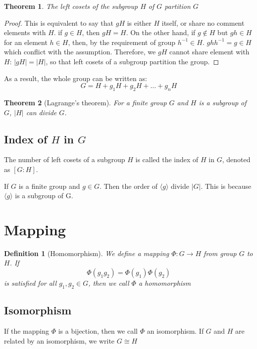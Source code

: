 \documentclass{amsart}
\newtheorem{definition}{Definition}
\newtheorem{theorem}{Theorem}
\begin{document}
\vspace{10pt}

\begin{theorem}
    The left cosets of the subgroup $H$ of $G$ partition $G$
\end{theorem}
\begin{proof}
    This is equivalent to say that $gH$ is either $H$ itself, or share no comment elements with $H$.
    if $g\in H$, then $gH = H$. On the other hand, 
    if $g\notin H$ but $gh \in H$ for an element $h\in H$, then, by the requirement of group $h^{-1}\in H$. $ghh^{-1} = g \in H$ which conflict with the assumption.
    Therefore, we $gH$ cannot share element with $H$: $|gH| = |H|$, so that left cosets of a subgroup partition the group.
\end{proof}
As a result, the whole group can be written as:
\[
    G = H + g_1 H + g_2 H + \dots + g_n H    
\]
\begin{theorem}[Lagrange's theorem]
    For a finite group $G$ and $H$ is a subgroup of $G$, $|H|$ can divide $G$.
\end{theorem}
\subsection*{Index of $H$ in $G$}
    The number of left cosets of a subgroup $H$ is called the index of $H$ in $G$, denoted as $[G:H]$.

If $G$ is a finite group and $g\in G$. Then the order of $\langle g\rangle$ divide $|G|$. This is because 
$\langle g\rangle$ is a subgroup of G.

\section{Mapping}

\begin{definition}[Homomorphism]
    We define a mapping $\Phi\colon G \to H$ from group $G$ to $H$. If
    \[
        \Phi(g_1 g_2) = \Phi(g_1) \Phi(g_2)    
    \] 
    is satisfied for all $g_1, g_2 \in G$, then we call $\Phi$ a homomorphism
\end{definition}

\subsection*{Isomorphism}
    If the mapping $\Phi$ is a bijection, then we call $\Phi$ an isomorphism. If $G$ and $H$ are related by 
    an isomorphism, we write $G\cong H$
\end{document}
